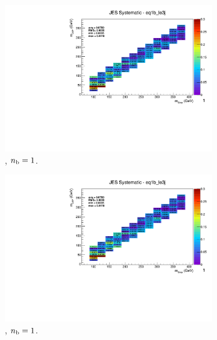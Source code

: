 \begin{figure}[ht!]
\begin{subfigure}[b]{0.32\textwidth}
    \includegraphics[width=\textwidth, page=8]{Figs/sms/t2degen/v19/systs_v2/T2_4body_JES_eq1b_le3j.pdf}
    \caption{\njlow, $n_{\text{b}} = 1$.}
  \end{subfigure}
  \begin{subfigure}[b]{0.32\textwidth}
    \includegraphics[width=\textwidth, page=1]{Figs/sms/t2degen/v19/systs_v2/T2_4body_JES_eq1b_le3j.pdf}
    \caption{\njlow, $n_{\text{b}} = 1$.}
    \label{fig:sms-jes-tdegen-le3j-1b}
  \end{subfigure}\\
  \begin{subfigure}[b]{0.32\textwidth}

\end{subfigure}
\end{figure}
